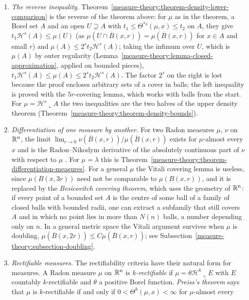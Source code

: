 \begin{remark}\label{measure-theory:remark-measure-densities}
\begin{enumerate}
\item \emph{The reverse inequality.} Theorem~\ref{measure-theory:theorem-density-lower-comparison} is the reverse of the theorem above: for $\mu$ as in the theorem, a Borel set $A$ and an open
$U \supseteq A$ with $t_1 \leq \Theta^{*s}(\mu, x) \leq t_2$ on $A$, they give $t_1\mathcal{H}^s(A) \leq \mu(U)$ (as $\mu(U \cap \overline{B}(x, r)) = \mu(\overline{B}(x, r))$ for $x \in A$ and small $r$)
and $\mu(A) \leq 2^st_2\mathcal{H}^s(A)$; taking the infimum over $U$, which is $\mu(A)$ by outer regularity (Lemma~\ref{measure-theory:lemma-closed-approximation}, applied on bounded pieces),
$t_1\mathcal{H}^s(A) \leq \mu(A) \leq 2^st_2\mathcal{H}^s(A)$. The factor $2^s$ on the right is lost because the proof encloses arbitrary sets of a cover in balls; the left inequality is proved with
the $5r$-covering lemma, which works with balls from the start. For $\mu = \mathcal{H}^s\llcorner A$ the two inequalities are the two halves of the upper density theorem
(Theorem~\ref{measure-theory:theorem-density-bounds}).
\item \emph{Differentiation of one measure by another.} For two Radon measures $\mu$, $\nu$ on $\mathbb{R}^n$, the limit $\lim_{r \to 0}\nu(\overline{B}(x, r))/\mu(\overline{B}(x, r))$ exists for $\mu$-almost every $x$
and is the Radon--Nikodym derivative of the absolutely continuous part of $\nu$ with respect to $\mu$ \cite[Chapter 1]{evans-gariepy}. For $\mu = \lambda$ this is
Theorem~\ref{measure-theory:theorem-differentiation-measures}. For a general $\mu$ the Vitali covering lemma is useless, since $\mu(B(x, 3r))$ need not be comparable to $\mu(B(x, r))$, and it is
replaced by the \emph{Besicovitch covering theorem}, which uses the geometry of $\mathbb{R}^n$: if every point of a bounded set $A$ is the centre of some ball of a family of closed balls with bounded radii,
one can extract a subfamily that still covers $A$ and in which no point lies in more than $N(n)$ balls, a number depending only on $n$. In a general metric space the Vitali argument survives
when $\mu$ is doubling, $\mu(\overline{B}(x, 2r)) \leq C\mu(\overline{B}(x, r))$; see Subsection~\ref{measure-theory:subsection-doubling}.
\item \emph{Rectifiable measures.} The rectifiability criteria have their natural form for measures. A Radon measure $\mu$ on $\mathbb{R}^n$ is \emph{$k$-rectifiable} if $\mu = \theta\mathcal{H}^k\llcorner E$
with $E$ countably $k$-rectifiable and $\theta$ a positive Borel function. \emph{Preiss's theorem} says that $\mu$ is $k$-rectifiable if and only if $0 < \Theta^k(\mu, x) < \infty$ for $\mu$-almost every

\end{enumerate}
\end{remark}
